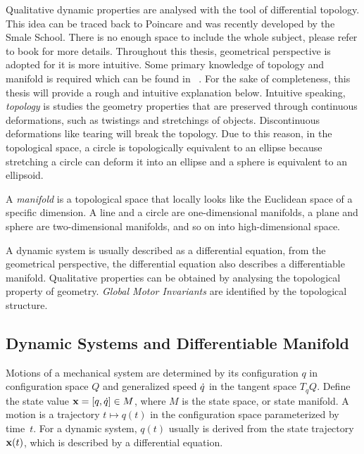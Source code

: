Qualitative dynamic properties are analysed with the tool of differential topology.
This idea can be traced back to Poincare\citep{Poincar'e1899,Poincar'e1885} and was recently developed by the Smale School\citep{Smale1970}.
There is no enough space to include the whole subject, please refer to book \citep{abraham1978foundations}for more details.
Throughout this thesis,  geometrical perspective is adopted for it is more intuitive.
Some primary knowledge of topology and manifold is required which can be found in ~\citep{abraham1978foundations}.
For the sake of completeness, this thesis will provide a rough and intuitive explanation below.
Intuitive speaking,   \emph{topology} is studies the geometry properties  that are preserved through continuous  deformations, such as twistings and stretchings of objects. Discontinuous deformations like tearing will break the topology. 
Due to this reason, in the topological space, a circle is topologically equivalent to an ellipse because stretching a circle can deform it into an ellipse and a sphere is equivalent to an ellipsoid.
 
A \emph{manifold} is a topological space that  locally looks like the Euclidean space of a specific dimension. 
A line and a circle are one-dimensional manifolds, a plane and sphere  are two-dimensional manifolds, and so on into high-dimensional space.


A dynamic system is usually described as a differential equation, from the geometrical perspective, the differential equation also describes a differentiable manifold.
Qualitative properties can be obtained by analysing the topological  property of geometry.
\emph{Global Motor Invariants} are identified by the topological structure.





\subsection{Dynamic Systems and Differentiable Manifold}
Motions of a mechanical system are determined by its configuration  $q$ in configuration space $Q$ and generalized speed $\dot{q}$ in the tangent space $T_{q}Q$. 
Define the state value $\mathbf{x}=[q,\dot{q}] \in M$, where $M$ is the state space, or state manifold.
A motion is a trajectory $t \mapsto q(t)$ in the configuration space parameterized by time~$t$.
For a dynamic system, $q(t)$ usually is derived from the state trajectory $\mathbf{x}(t)$, which is described by a differential equation. 



